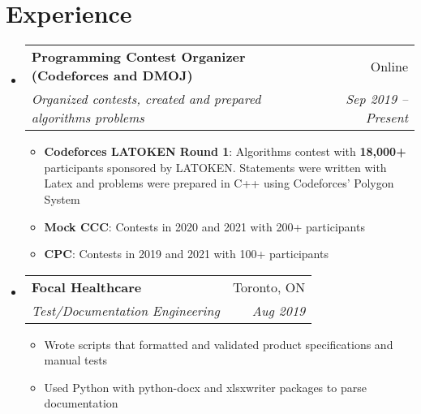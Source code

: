 \documentclass[letterpaper,11pt]{article}
\makeatletter
\newcommand{\resumeItem}[2]{
  \item\small{
    \textbf{#1}{: #2 \vspace{-2pt}}
  }
}
\newcommand{\resumeText}[1]{
  \item\small{
    \textbf{}{#1 \vspace{-2pt}}
  }
}
\newcommand{\resumeSubheading}[4]{
  \vspace{-1pt}\item
    \begin{tabular*}{0.97\textwidth}[t]{l@{\extracolsep{\fill}}r}
      \textbf{#1} & #2 \\
      \textit{\small#3} & \textit{\small #4} \\
    \end{tabular*}\vspace{-5pt}
}
\newcommand{\resumeSubHeadingListStart}{\begin{itemize}[leftmargin=*]}
\newcommand{\resumeSubHeadingListEnd}{\end{itemize}}
\newcommand{\resumeItemListStart}{\begin{itemize}}
\newcommand{\resumeItemListEnd}{\end{itemize}\vspace{-5pt}}
\newcommand{\link}[2]{\href{#1}{#2}}
\newcommand{\linkblack}[2]{\href{#1}{#2}}
\makeatother
\begin{document}
\section{Experience}
  \resumeSubHeadingListStart
    \resumeSubheading
      {Programming Contest Organizer (Codeforces and DMOJ)}{Online}
      {Organized contests, created and prepared algorithms problems}{Sep 2019 -- Present}
      \resumeItemListStart
        \resumeItem{Codeforces LATOKEN Round 1}{Algorithms contest with \textbf{18,000+} participants sponsored by LATOKEN.  Statements were written with Latex and problems were prepared in C++ using Codeforces' Polygon System \linkblack{https://codeforces.com/contest/1534}{\faLink}}
        \resumeItem{Mock CCC}
          {Contests in 2020 and 2021 with 200+ participants \linkblack{https://dmoj.ca/contest/mccc1}{\faLink} \linkblack{https://dmoj.ca/contest/rccc1}{\faLink}}
        \resumeItem{CPC}
          {Contests in 2019 and 2021 with 100+ participants \linkblack{https://dmoj.ca/contest/cpc19}{\faLink} \linkblack{https://dmoj.ca/contest/cpc21c1}{\faLink}}
      \resumeItemListEnd
    
    
    \resumeSubheading
      {Focal Healthcare}{Toronto, ON}
      {Test/Documentation Engineering}{Aug 2019}
      \resumeItemListStart
        \resumeText{Wrote scripts that formatted and validated product specifications and manual tests}
        \resumeText{Used Python with python-docx and xlsxwriter packages to parse documentation}
      \resumeItemListEnd
  \resumeSubHeadingListEnd

\end{document}
